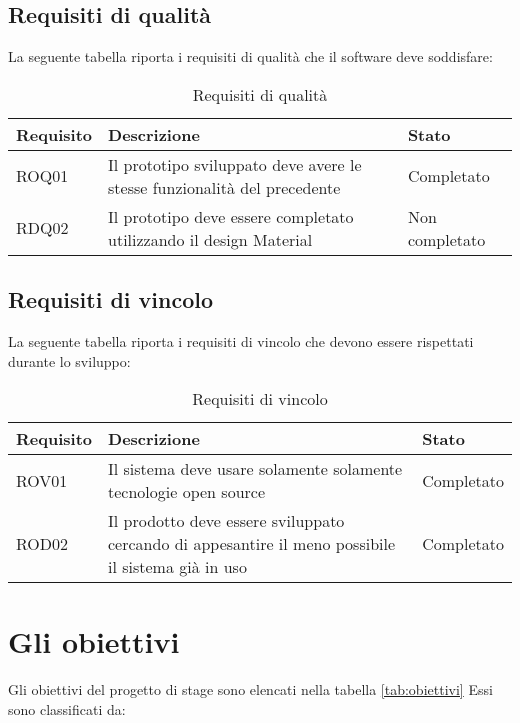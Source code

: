 \subsection*{Requisiti di qualità}
La seguente tabella riporta i requisiti di qualità che il software deve soddisfare:\\
\begin{table} [h]%
	\centering
	\caption{Requisiti di qualità}
	\label{tab:requisiti-di-qualità}
	\begin{tabular}[h]{|p{2.5cm}|p{8cm}|p{2.5cm}|}
		\hline
		\rule[-4mm]{0mm}{1cm}
		Requisito & Descrizione & Stato\\
		\hline
		\rule[-3mm]{0mm}{0.8cm}
		ROQ01&Il prototipo sviluppato deve avere le stesse funzionalità del precedente&Completato\\
		\hline
		\rule[-3mm]{0mm}{0.8cm}
		RDQ02&Il prototipo deve essere completato utilizzando il design Material&Non completato\\
		\hline	
	\end{tabular}
\end{table}

\subsection*{Requisiti di vincolo}
La seguente tabella riporta i requisiti di vincolo che devono essere rispettati durante lo sviluppo:
\begin{table}[h]
	\centering
	\caption{Requisiti di vincolo}
	\label{tab:requisiti-di-vincolo}
	\begin{tabular}[h]{|p{2.5cm}|p{8cm}|p{2.5cm}|}
		\hline
		\rule[-4mm]{0mm}{1cm}
		Requisito & Descrizione & Stato\\
		\hline
		\rule[-3mm]{0mm}{0.8cm}
		ROV01&Il sistema deve usare solamente solamente tecnologie open source&Completato\\
		\hline
		\rule[-3mm]{0mm}{0.8cm}
		ROD02&Il prodotto deve essere sviluppato cercando di appesantire il meno possibile il sistema già in uso &Completato\\
		\hline	
	\end{tabular}
\end{table}

\newpage

\section{Gli obiettivi}
Gli obiettivi del progetto di stage sono elencati nella tabella \ref{tab:obiettivi}
Essi sono classificati da:

